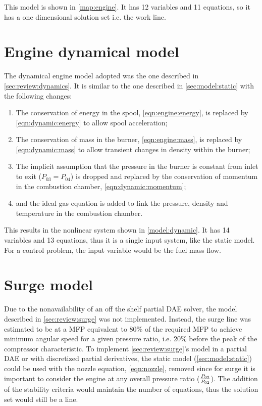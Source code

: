 \documentclass[tcc]{subfiles}
\begin{document}
This model is shown in \cref{map:engine}. It has 12 variables and 11 equations, so it has a one dimensional solution set i.e. the work line.


\section{Engine dynamical model}
The dynamical engine model adopted was the one described in \cref{sec:review:dynamics}. It is similar to the one described in \cref{sec:model:static} with the following changes:

\begin{enumerate}
    \item The conservation of energy in the spool, \cref{eqn:engine:energy}, is replaced by \cref{eqn:dynamic:energy} to allow spool acceleration;
    \item The conservation of mass in the burner, \cref{eqn:engine:mass}, is replaced by \cref{eqn:dynamic:mass}  to allow transient changes in density within the burner;
    \item The implicit assumption that the pressure in the burner is constant from inlet to exit ($P_{03}=P_{04}$) is dropped and replaced by the conservation of momentum in the combustion chamber, \cref{eqn:dynamic:momentum};
    \item and the ideal gas equation is added to link the pressure, density and temperature in the combustion chamber.
\end{enumerate}

This results in the nonlinear system shown in \cref{model:dynamic}. It has 14 variables and 13 equations, thus it is a single input system, like the static model. For a control problem, the input variable would be the fuel mass flow.



\section{Surge model}

Due to the nonavailability of an off the shelf partial \ac{DAE} solver, the model described in \cref{sec:review:surge} was not implemented. Instead, the surge line was estimated to be at a \acs{MFP} equivalent to 80\% of the required \acs{MFP} to achieve minimum angular speed for a given pressure ratio, i.e. 20\% before the peak of the compressor characteristic. 
To implement \cref{sec:review:surge}'s model in a partial \ac{DAE} or with discretized partial derivatives, the static model (\cref{sec:model:static}) could be used with the nozzle equation, \cref{eqn:nozzle}, removed since for surge it is important to consider the engine at any overall pressure ratio ($\frac{P_{05}}{P_{02}}$). The addition of the stability criteria would maintain the number of equations, thus the solution set would still be a line.
\end{document}
